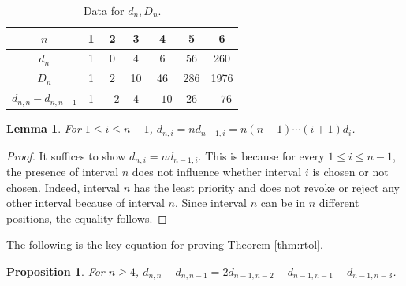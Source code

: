 \documentclass[reqno,11pt]{article} %
\newtheorem{lemma}[theorem]{Lemma}
\newtheorem{proposition}[theorem]{Proposition}
\theoremstyle{remark}
\newcommand{\RtoL}{\text{RevtoL}\xspace} %
\begin{document}
\begin{table}[ht!]  
\centering
\caption{Data for $d_n, D_n$.} \label{tab:data} \label{tab:data}
\begin{tabular}{|c|c|c|c|c|c|c|}
\hline
$n$   & 1 & 2 & 3  & 4  & 5   & 6    \\ 
\hline
$d_n$ & 1 & 0 & 4  & 6  & 56  & 260  \\ 
\hline
$D_n$ & 1 & 2 & 10 & 46 & 286 & 1976 \\ 
\hline
$d_{n,n} - d_{n,n-1} $ & 1 & $-2$ & 4 & $-10$ & 26 & $-76$ \\ 
\hline
\end{tabular}
\end{table}


\begin{lemma}   \label{lem:one_step_reduction}
    For $1 \le i \le n-1$,
	$d_{n,i} = n d_{n-1,i} = n (n-1) \cdots (i+1) d_i$.
\end{lemma}

\begin{proof}
    It suffices to show 
        $d_{n,i} = n d_{n-1,i}$.
    This is because for every $1 \le i \le n-1$, the presence of interval $n$ does not influence whether interval $i$  is chosen or not chosen. Indeed, interval $n$ has the least priority and \RtoL does not revoke or reject any other interval because of interval $n$. Since interval $n$ can be in $n$ different positions, the equality follows.
\end{proof}





The following is the key equation for proving Theorem \ref{thm:rtol}.

\begin{proposition}   \label{thm:formula_dn_difference}
    For $n\ge 4$,
        $d_{n,n} - d_{n,n-1} = 2d_{n-1,n-2} - d_{n-1,n-1} - d_{n-1,n-3}$.
\end{proposition}
\end{document}
